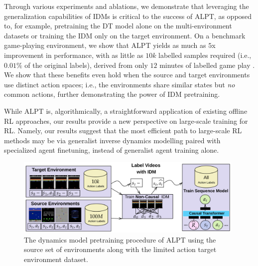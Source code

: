 \documentclass{article} %
\begin{document}
Through various experiments and ablations, we demonstrate that leveraging the generalization capabilities of IDMs is critical to the success of ALPT, as opposed to, for example, pretraining the DT model alone on the multi-environment datasets or training the IDM only on the target environment.
On a benchmark game-playing environment, we show that ALPT yields as much as $5$x improvement in performance, with as little as $10k$ labelled samples required (i.e., $0.01\%$ of the original labels), derived from only $12$ minutes of labelled game play \citep{ye2021mastering}.
We show that these benefits even hold when the source and target environments use distinct action spaces; i.e., the environments share similar states but \emph{no} common actions, further demonstrating the power of IDM pretraining.

While ALPT is, algorithmically, a straightforward application of existing offline RL approaches, our results provide a new perspective on  large-scale training for RL. Namely, our results suggest that the most efficient path to large-scale RL methods may be via generalist inverse dynamics modelling paired with specialized agent finetuning, instead of generalist agent training alone.

\begin{figure}
    \centering
    \includegraphics[width=11cm]{idm_model.png}
    \caption{The dynamics model pretraining procedure of ALPT using the source set of environments along with the limited action target environment dataset.}
    \label{fig:idm}
    \vspace{-0.4cm}
\end{figure}
\end{document}
